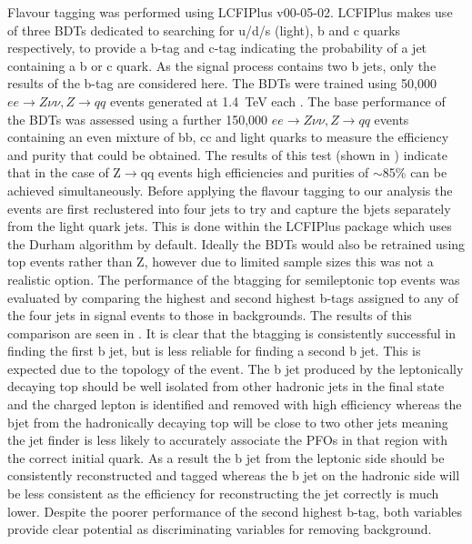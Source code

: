 Flavour tagging was performed using LCFIPlus v00-05-02\cite{Suehara:2015ura}. LCFIPlus makes use of three BDTs dedicated to searching for u/d/s (light), b and c quarks respectively, to provide a b-tag and c-tag indicating the probability of a jet containing a b or c quark. As the signal process contains two b jets, only the results of the b-tag are considered here. The BDTs were trained using 50,000 $ee\rightarrow Z\nu\nu, Z\rightarrow qq$ events generated at 1.4~TeV each . The base performance of the BDTs was assessed using a further 150,000 $ee\rightarrow Z\nu\nu, Z\rightarrow qq$ events containing an even mixture of bb, cc and light quarks to measure the efficiency and purity that could be obtained. The results of this test (shown in ) indicate that in the case of Z$\rightarrow$qq events high efficiencies and purities of $\sim$85\% can be achieved simultaneously. Before applying the flavour tagging to our analysis the events are first reclustered into four jets to try and capture the bjets separately from the light quark jets. This is done within the LCFIPlus package which uses the Durham algorithm by default. Ideally the BDTs would also be retrained using top events rather than Z, however due to limited sample sizes this was not a realistic option. The performance of the btagging for semileptonic top events was evaluated by comparing the highest and second highest b-tags assigned to any of the four jets in signal events to those in backgrounds. The results of this comparison are seen in . It is clear that the btagging is consistently successful in finding the first b jet, but is less reliable for finding a second b jet. This is expected due to the topology of the event. The b jet produced by the leptonically decaying top should be well isolated from other hadronic jets in the final state and the charged lepton is identified and removed with high efficiency whereas the bjet from the hadronically decaying top will be close to two other jets meaning the jet finder is less likely to accurately associate the PFOs in that region with the correct initial quark. As a result the b jet from the leptonic side should be consistently reconstructed and tagged whereas the b jet on the hadronic side will be less consistent as the efficiency for reconstructing the jet correctly is much lower. Despite the poorer performance of the second highest b-tag, both variables provide clear potential as discriminating variables for removing background. 



